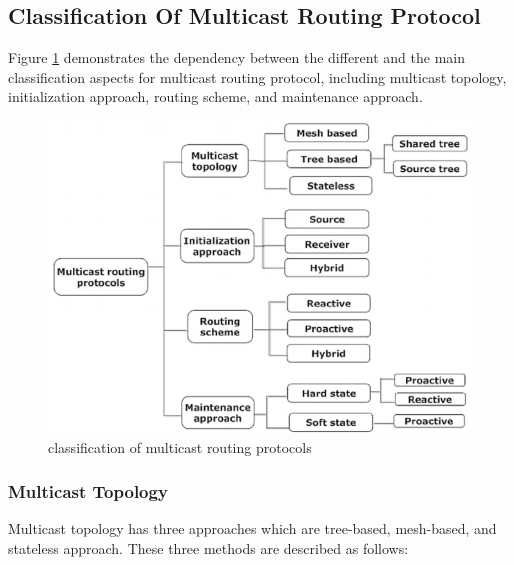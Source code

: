 \subsection{Classification Of Multicast Routing Protocol}
Figure \ref{fig:mc-classification} demonstrates the dependency between the different and the main classification aspects for multicast routing protocol, including multicast topology, initialization approach, routing scheme, and maintenance approach.
\begin{figure}[!htb]
    \centering
    \includegraphics[scale=0.5]{images/mc-classification.png}
    \caption{classification of multicast routing protocols}
    \label{fig:mc-classification}
\end{figure}

\subsubsection{Multicast Topology}
Multicast topology has three approaches which are tree-based, mesh-based, and stateless approach. These three methods are described as follows:

